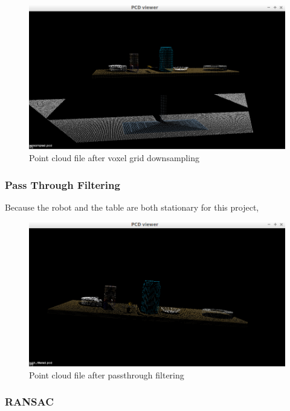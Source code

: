 \documentclass{article}
\begin{document}
\begin{figure}[H]
    \includegraphics[width=\linewidth]{ex1downsampled.png}
    \caption{Point cloud file after voxel grid downsampling}
    \label{fig:downsampled}
\end{figure}

\subsubsection{Pass Through Filtering}
Because the robot and the table are both stationary for this project, 

\begin{figure}[H]
    \includegraphics[width=\linewidth]{ex1passthrough.png}
    \caption{Point cloud file after passthrough filtering}
    \label{fig:passthrough}
\end{figure}

\subsubsection{RANSAC}
\end{document}
